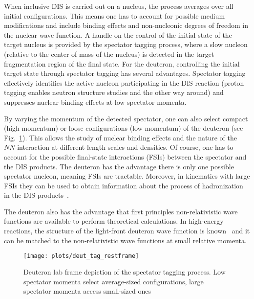 When inclusive DIS is carried out on a nucleus, the process averages over all initial configurations.  This means one has to account for possible medium modifications and include binding effects and non-nucleonic degrees of freedom in the nuclear wave function.  A handle on the control of the initial state of the target nucleus is provided by the spectator tagging process, where a slow nucleon (relative to the center of mass of the nucleus) is detected in the target fragmentation region of the final state.  For the deuteron, controlling the initial target state through spectator tagging has several advantages.  Spectator tagging effectively identifies the active nucleon participating in the DIS reaction (proton tagging enables neutron structure studies and the other way around) and suppresses nuclear binding effects at low spectator momenta. 

By varying the momentum of the detected spectator, one can also select compact (high momentum) or loose configurations (low momentum) of the deuteron (see Fig.~\ref{fig:size}).  This allows the study of nuclear binding effects and the nature of the $NN$-interaction at different length scales and densities.  Of course, one has to account for the possible final-state interactions (FSIs) between the spectator and the DIS products.  The deuteron has the advantage there is only one possible spectator nucleon, meaning FSIs are tractable.  Moreover, in kinematics with large FSIs they can be used to obtain information about the process of hadronization in the DIS products~\cite{Cosyn:2017ekf}.  

The deuteron also has the advantage that first principles non-relativistic wave functions are available to perform theoretical calculations.  In high-energy reactions, the structure of the light-front deuteron wave function is known~\cite{Frankfurt:1981mk,Keister:1991sb} and it can be matched to the non-relativistic wave functions at small relative momenta.

    \begin{figure}[tbp]
        \centering\texttt{[image: plots/deut\_tag\_restframe]}
        \caption{Deuteron lab frame depiction of the spectator tagging process.  Low spectator momenta select average-sized configurations, large spectator momenta access small-sized ones~\cite{deutLDRD}}
        \label{fig:size}
    \end{figure}


